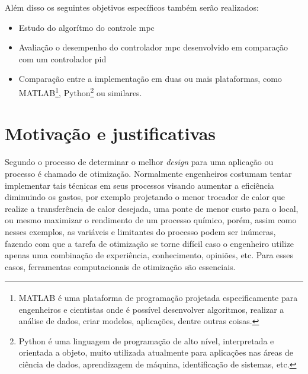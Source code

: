 Além disso os seguintes objetivos específicos também serão realizados:
\begin{itemize}
    \item Estudo do algorítmo do controle \acrshort{mpc}
    \item Avaliação o desempenho do controlador \acrshort{mpc} desenvolvido em
        comparação com um controlador \acrshort{pid}
    \item Comparação entre a implementação em duas ou mais plataformas,
        como MATLAB\textsuperscript{\tiny\textregistered}\footnote{
            MATLAB\textsuperscript{\tiny\textregistered} é uma plataforma                           %
            de programação projetada especificamente para engenheiros e cientistas                  %
            onde é possível desenvolver algoritmos, realizar a análise de dados,                    %
            criar modelos, aplicações, dentre outras coisas.},                                      %
        Python\footnote{
            Python é uma linguagem de programação de alto nível,                                    %
            interpretada e orientada a objeto, muito utilizada atualmente para                      %
            aplicações nas áreas de ciência de dados, aprendizagem de máquina,                      %
            identificação de sistemas, etc.}                                                        %
        ou similares.
\end{itemize}

\section{Motivação e justificativas}
\label{sec:motivacao_e_justificativas}

Segundo  o processo de determinar o melhor \textit{design}
para uma aplicação ou processo é chamado de otimização. Normalmente engenheiros
costumam tentar implementar tais técnicas em seus processos visando aumentar a
eficiência diminuindo os gastos, por exemplo projetando o menor trocador de calor
que realize a transferência de calor desejada, uma ponte de menor custo para o local,
ou mesmo maximizar o rendimento de um processo químico, porém, assim como nesses
exemplos, as variáveis e limitantes do processo podem ser inúmeras, fazendo com que a
tarefa de otimização se torne difícil caso o engenheiro utilize apenas uma combinação
de experiência, conhecimento, opiniões, etc. Para esses casos, ferramentas
computacionais de otimização são essenciais.

